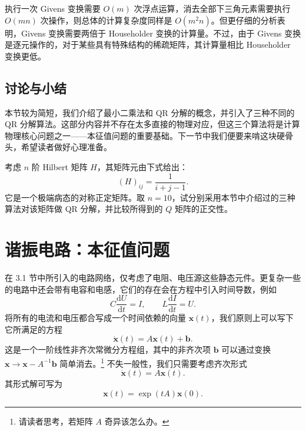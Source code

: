 执行一次 Givens 变换需要 $O(m)$ 次浮点运算，消去全部下三角元素需要执行 $O(mn)$ 次操作，则总体的计算复杂度同样是 $O(m^2n)$。但更仔细的分析表明，Givens 变换需要两倍于 Householder 变换的计算量。不过，由于 Givens 变换是逐元操作的，对于某些具有特殊结构的稀疏矩阵，其计算量相比 Householder 变换更低。

\subsection{讨论与小结}

本节较为简短，我们介绍了最小二乘法和 QR 分解的概念，并引入了三种不同的 QR 分解算法。这部分内容并不存在太多直接的物理对应，但这三个算法将是计算物理核心问题之一——本征值问题的重要基础。下一节中我们便要来啃这块硬骨头，希望读者做好心理准备。

\begin{exerciseBox}[练习 3.2]
考虑 $n$ 阶 Hilbert 矩阵 $H$，其矩阵元由下式给出：
\begin{equation}
(H)_{ij}=\frac{1}{i+j-1}.
\tag{3.3.15}
\end{equation}
它是一个极端病态的对称正定矩阵。取 $n=10$，试分别采用本节中介绍过的三种算法对该矩阵做 QR 分解，并比较所得到的 $Q$ 矩阵的正交性。
\end{exerciseBox}



\section{谐振电路：本征值问题}

在 3.1 节中所引入的电路网络，仅考虑了电阻、电压源这些静态元件。更复杂一些的电路中还会带有电容和电感，它们的存在会在方程中引入时间导数，例如
\begin{equation}
C\frac{\mathrm dU}{\mathrm dt}=I,
\qquad
L\frac{\mathrm dI}{\mathrm dt}=U.
\tag{3.4.1}
\end{equation}
将所有的电流和电压都合写成一个时间依赖的向量 $\bm x(t)$，我们原则上可以写下它所满足的方程
\begin{equation}
\dot{\bm x}(t)=A\bm x(t)+\bm b.
\tag{3.4.2}
\end{equation}
这是一个一阶线性非齐次常微分方程组，其中的非齐次项 $\bm b$ 可以通过变换 $\bm x\to\bm x-A^{-1}\bm b$ 简单消去。\footnote{请读者思考，若矩阵 $A$ 奇异该怎么办。} 不失一般性，我们只需要考虑齐次形式
\begin{equation}
\dot{\bm x}(t)=A\bm x(t).
\tag{3.4.3}
\end{equation}
其形式解可写为
\begin{equation}
\bm x(t)=\exp(tA)\bm x(0).
\tag{3.4.4}
\end{equation}

